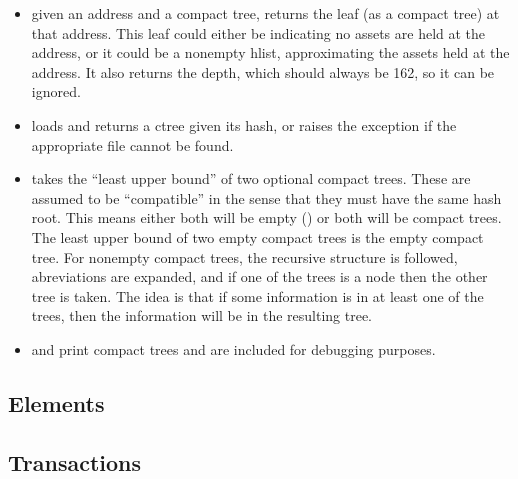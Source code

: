 \begin{itemize}
\item {} given an address and a compact tree,
returns the leaf (as a compact tree) at that address.
This leaf could either be {} indicating no assets are held at the address,
or it could be a nonempty hlist, approximating the assets held at the address.
It also returns the depth, which should always be 162, so it can be ignored.
\item {} loads and returns a ctree given its hash, or
raises the {} exception if the appropriate file cannot be found.
\item {} takes the ``least upper bound'' of two optional compact trees.
These are assumed to be ``compatible'' in the sense that they must have the same hash root.
This means either both will be empty ({})
or both will be compact trees.
The least upper bound of two empty compact trees is the empty compact tree.
For nonempty compact trees, the recursive structure is followed,
abreviations are expanded, and if one of the trees is a {}
node then the other tree is taken.
The idea is that if some information is in at least one of the trees,
then the information will be in the resulting tree.
\item {} and {} print compact trees and are included for debugging purposes.
\end{itemize}

\subsection{Elements}


\subsection{Transactions}

